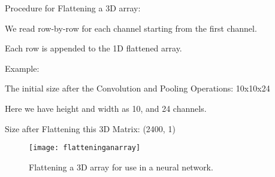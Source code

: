 \vspace{\baselineskip}
Procedure for Flattening a 3D array:
	\begin{numberedlist}
		\item We read row-by-row for each channel starting from the first channel.
		\item Each row is appended to the 1D flattened array.
	\end{numberedlist}

\vspace{\baselineskip}
Example:
	\begin{bulletedlist}
		\item The initial size after the Convolution and Pooling Operations: 10x10x24
		\item Here we have height and width as 10, and 24 channels.
		\item Size after Flattening this 3D Matrix: (2400, 1)
	\end{bulletedlist}

	\begin{figure}[htb]
		\centering
		\texttt{[image: flatteninganarray]}
		\caption[Flattening a 3D array]{Flattening a 3D array for use in a neural network.}
		\label{fig:flatteninganarray}
	\end{figure}
